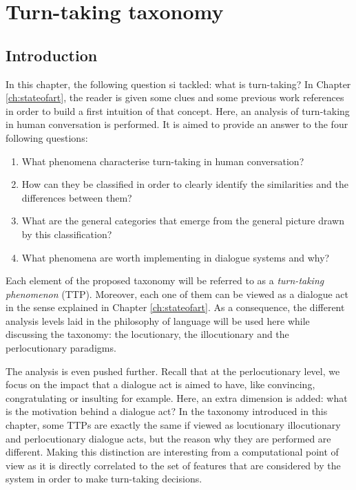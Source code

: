 \chapter{Turn-taking taxonomy}
\label{ch:taxonomy}


\section{Introduction}

				In this chapter, the following question si tackled: what is turn-taking? In Chapter \ref{ch:stateofart}, the reader is given some clues and some previous work references in order to build a first intuition of that concept. Here, an analysis of turn-taking in human conversation is performed. It is aimed to provide an answer to the four following questions:

        \begin{enumerate}
          \item What phenomena characterise turn-taking in human conversation?
          \item How can they be classified in order to clearly identify the similarities and the differences between them?
          \item What are the general categories that emerge from the general picture drawn by this classification?
          \item What phenomena are worth implementing in dialogue systems and why?
        \end{enumerate}

        Each element of the proposed taxonomy will be referred to as a \textit{turn-taking phenomenon} (TTP). Moreover, each one of them can be viewed as a dialogue act in the sense explained in Chapter \ref{ch:stateofart}. As a consequence, the different analysis levels laid in the philosophy of language will be used here while discussing the taxonomy: the locutionary, the illocutionary and the perlocutionary paradigms.

        The analysis is even pushed further. Recall that at the perlocutionary level, we focus on the impact that a dialogue act is aimed to have, like convincing, congratulating or insulting for example. Here, an extra dimension is added: what is the motivation behind a dialogue act? In the taxonomy introduced in this chapter, some TTPs are exactly the same if viewed as locutionary illocutionary and perlocutionary dialogue acts, but the reason why they are performed are different. Making this distinction are interesting from a computational point of view as it is directly correlated to the set of features that are considered by the system in order to make turn-taking decisions.

